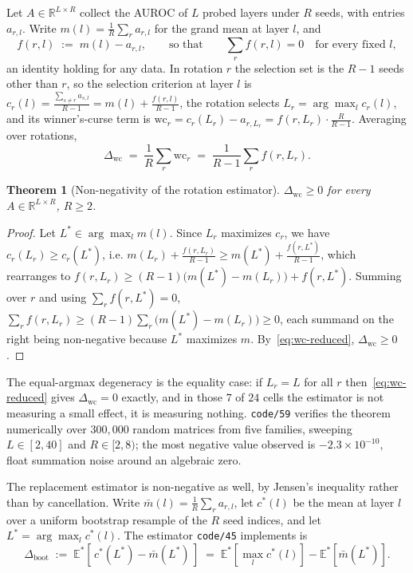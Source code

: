 \documentclass{article}
\newtheorem{theorem}{Theorem}
\begin{document}
Let $A\in\mathbb{R}^{L\times R}$ collect the AUROC of $L$ probed layers under
$R$ seeds, with entries $a_{r,l}$. Write $m(l)=\tfrac{1}{R}\sum_r a_{r,l}$ for
the grand mean at layer $l$, and
\[
f(r,l)\;:=\;m(l)-a_{r,l},
\qquad\text{so that}\qquad
\sum_{r} f(r,l)=0 \quad\text{for every fixed } l,
\]
an identity holding for any data. In rotation $r$ the selection set is the
$R-1$ seeds other than $r$, so the selection criterion at layer $l$ is
$c_r(l)=\frac{\sum_{s\neq r} a_{s,l}}{R-1}=m(l)+\frac{f(r,l)}{R-1}$, the
rotation selects $L_r=\arg\max_l c_r(l)$, and its winner's-curse term is
$\text{wc}_r=c_r(L_r)-a_{r,L_r}=f(r,L_r)\cdot\tfrac{R}{R-1}$. Averaging over
rotations,
\begin{equation}
\Delta_{\text{wc}}
\;=\;\frac{1}{R}\sum_{r}\text{wc}_r
\;=\;\frac{1}{R-1}\sum_{r} f(r,L_r).
\label{eq:wc-reduced}
\end{equation}

\begin{theorem}[Non-negativity of the rotation estimator]
\label{thm:wc-nonneg}
$\Delta_{\text{wc}}\ge 0$ for every $A\in\mathbb{R}^{L\times R}$, $R\ge2$.
\end{theorem}

\begin{proof}
Let $L^{*}\in\arg\max_l m(l)$. Since $L_r$ maximizes $c_r$, we have
$c_r(L_r)\ge c_r(L^{*})$, i.e.
$m(L_r)+\tfrac{f(r,L_r)}{R-1}\ge m(L^{*})+\tfrac{f(r,L^{*})}{R-1}$, which
rearranges to
$f(r,L_r)\ge (R-1)\bigl(m(L^{*})-m(L_r)\bigr)+f(r,L^{*})$. Summing over $r$
and using $\sum_r f(r,L^{*})=0$,
$\sum_{r} f(r,L_r)\ge(R-1)\sum_{r}\bigl(m(L^{*})-m(L_r)\bigr)\ge 0$,
each summand on the right being non-negative because $L^{*}$ maximizes $m$.
By~\eqref{eq:wc-reduced}, $\Delta_{\text{wc}}\ge0$.
\end{proof}

The equal-argmax degeneracy is the equality case: if $L_r=L$ for all $r$
then~\eqref{eq:wc-reduced} gives $\Delta_{\text{wc}}=0$ exactly, and in those
$7$ of $24$ cells the estimator is not measuring a small effect, it is
measuring nothing. \texttt{code/59} verifies the theorem numerically over
$300{,}000$ random matrices from five families, sweeping $L\in[2,40]$ and
$R\in[2,8)$; the most negative value observed is $-2.3\times10^{-10}$, float
summation noise around an algebraic zero.

The replacement estimator is non-negative as well, by Jensen's inequality
rather than by cancellation. Write $\bar m(l)=\tfrac1R\sum_r a_{r,l}$, let
$c^{*}(l)$ be the mean at layer $l$ over a uniform bootstrap resample of the
$R$ seed indices, and let $L^{*}=\arg\max_l c^{*}(l)$. The estimator
\texttt{code/45} implements is
\begin{equation}
\Delta_{\text{boot}}
\;:=\;\mathbb{E}^{*}\!\left[\,c^{*}(L^{*})-\bar m(L^{*})\,\right]
\;=\;\mathbb{E}^{*}\!\left[\max_l c^{*}(l)\right]-\mathbb{E}^{*}\!\left[\bar m(L^{*})\right].
\label{eq:boot-split}
\end{equation}
\end{document}

